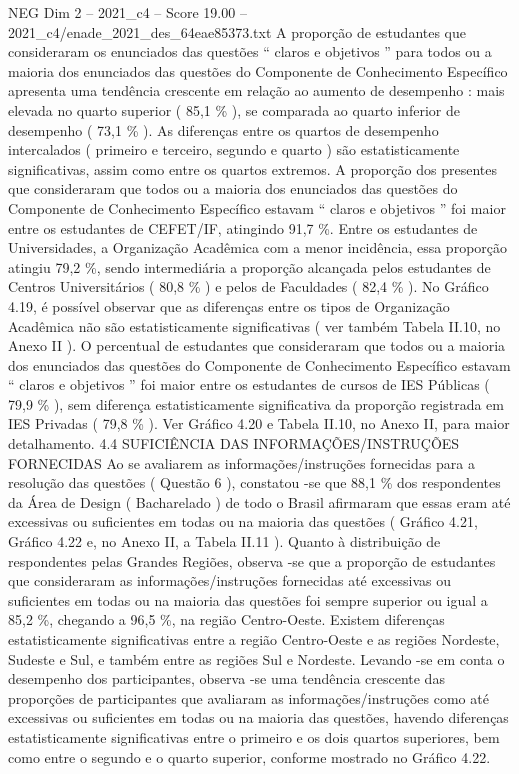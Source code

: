 \begin{textsample}{NEG Dim 2 – 2021\_c4 – Score 19.00 – 2021\_c4/enade\_2021\_des\_64eae85373.txt}
A proporção de estudantes que consideraram os enunciados das questões “ claros e objetivos ” para todos ou a maioria dos enunciados das questões do Componente de Conhecimento Específico apresenta uma tendência crescente em relação ao aumento de desempenho : mais elevada no quarto superior ( 85,1 \% ), se comparada ao quarto inferior de desempenho ( 73,1 \% ).
As diferenças entre os quartos de desempenho intercalados ( primeiro e terceiro, segundo e quarto ) são estatisticamente significativas, assim como entre os quartos extremos.
A proporção dos presentes que consideraram que todos ou a maioria dos enunciados das questões do Componente de Conhecimento Específico estavam “ claros e objetivos ” foi maior entre os estudantes de CEFET/IF, atingindo 91,7 \%.
Entre os estudantes de Universidades, a Organização Acadêmica com a menor incidência, essa proporção atingiu 79,2 \%, sendo intermediária a proporção alcançada pelos estudantes de Centros Universitários ( 80,8 \% ) e pelos de Faculdades ( 82,4 \% ).
No Gráfico 4.19, é possível observar que as diferenças entre os tipos de Organização Acadêmica não são estatisticamente significativas ( ver também Tabela II.10, no Anexo II ).
O percentual de estudantes que consideraram que todos ou a maioria dos enunciados das questões do Componente de Conhecimento Específico estavam “ claros e objetivos ” foi maior entre os estudantes de cursos de IES Públicas ( 79,9 \% ), sem diferença estatisticamente significativa da proporção registrada em IES Privadas ( 79,8 \% ).
Ver Gráfico 4.20 e Tabela II.10, no Anexo II, para maior detalhamento. 4.4 SUFICIÊNCIA DAS INFORMAÇÕES/INSTRUÇÕES FORNECIDAS Ao se avaliarem as informações/instruções fornecidas para a resolução das questões ( Questão 6 ), constatou -se que 88,1 \% dos respondentes da Área de Design ( Bacharelado ) de todo o Brasil afirmaram que essas eram até excessivas ou suficientes em todas ou na maioria das questões ( Gráfico 4.21, Gráfico 4.22 e, no Anexo II, a Tabela II.11 ).
Quanto à distribuição de respondentes pelas Grandes Regiões, observa -se que a proporção de estudantes que consideraram as informações/instruções fornecidas até excessivas ou suficientes em todas ou na maioria das questões foi sempre superior ou igual a 85,2 \%, chegando a 96,5 \%, na região Centro-Oeste.
Existem diferenças estatisticamente significativas entre a região Centro-Oeste e as regiões Nordeste, Sudeste e Sul, e também entre as regiões Sul e Nordeste.
Levando -se em conta o desempenho dos participantes, observa -se uma tendência crescente das proporções de participantes que avaliaram as informações/instruções como até excessivas ou suficientes em todas ou na maioria das questões, havendo diferenças estatisticamente significativas entre o primeiro e os dois quartos superiores, bem como entre o segundo e o quarto superior, conforme mostrado no Gráfico 4.22.

\end{textsample}
